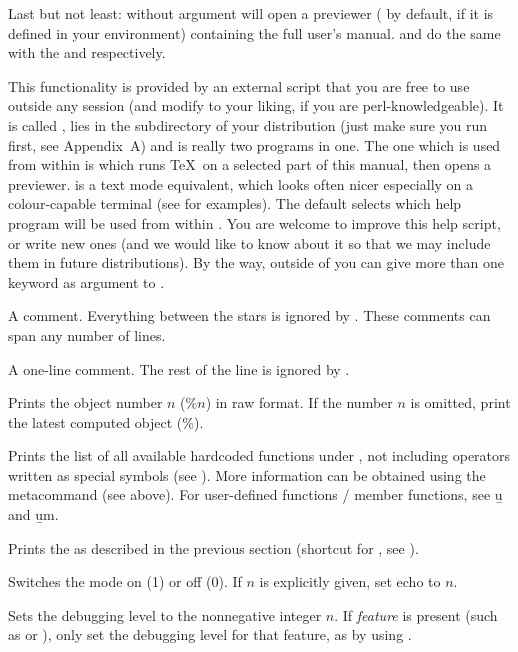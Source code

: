 Last but not least:  without argument will open a 
previewer ( by default,  if it is defined in your
environment) containing the full user's manual.  and
 do the same with the  and 
respectively.

 This functionality is provided by an
external  script that you are free to use outside any  session
(and modify to your liking, if you are perl-knowledgeable). It is called
, lies in the  subdirectory of your distribution
(just make sure you run  first, see Appendix~A) and is
really two programs in one. The one which is used from within  is
 which runs \TeX\ on a selected part of this manual, then opens
a previewer.  is a text mode equivalent, which looks
often nicer especially on a colour-capable terminal (see
 for examples). The default  selects which
help program will be used from within . You are welcome to improve this
help script, or write new ones (and we would like to know about it
so that we may include them in future distributions). By the way, outside
of  you can give more than one keyword as argument to .

 A comment. Everything between the stars is ignored by
. These comments can span any number of lines.

\subseckbd{\bs\bs} A one-line comment. The rest of the line
is ignored by .

 Prints the object number $n$ ($\%n$)
in raw format. If the number $n$ is omitted, print the latest computed object
($\%$). \label{se:history}

 Prints the list of all available
hardcoded functions under , not including operators written as special
symbols (see ). More information can be obtained using
the  metacommand (see above). For user-defined functions / member
functions, see \b{u} and \b{um}.

 Prints the  as described in the
previous section (shortcut for , see ).

 Switches the  mode on (1) or off (0). If
$n$ is explicitly given, set echo to $n$.

 Sets the debugging level  to the
nonnegative integer $n$. If \emph{feature} is present (such as  or
), only set the debugging level for that feature, as by using
.

